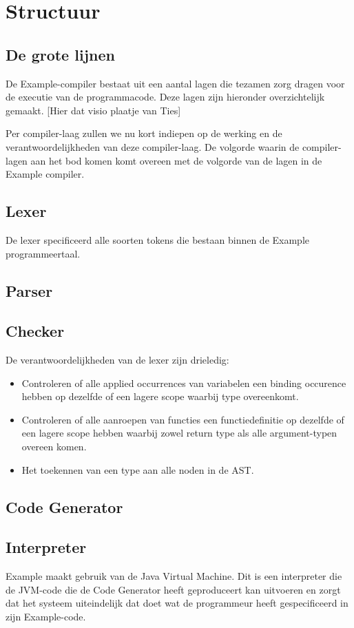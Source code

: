 \chapter{Structuur}
\section{De grote lijnen}
De Example-compiler bestaat uit een aantal lagen die tezamen zorg dragen voor de executie van de programmacode. Deze lagen zijn hieronder overzichtelijk gemaakt. 
[Hier dat visio plaatje van Ties]

Per compiler-laag zullen we nu kort indiepen op de werking en de verantwoordelijkheden van deze compiler-laag. De volgorde waarin de compiler-lagen aan het bod komen komt overeen met de volgorde van de lagen in de Example compiler. 

\section{Lexer}
De lexer specificeerd alle soorten tokens die bestaan binnen de Example programmeertaal.
\section{Parser}
\section{Checker}
De verantwoordelijkheden van de lexer zijn drieledig:
\begin{itemize}
	\item Controleren of alle applied occurrences van variabelen een binding occurence hebben op dezelfde of een lagere scope waarbij type overeenkomt.
	\item Controleren of alle aanroepen van functies een functiedefinitie op dezelfde of een lagere scope hebben waarbij zowel return type als alle argument-typen overeen komen.
	\item Het toekennen van een type aan alle noden in de AST.
\end{itemize}
\section{Code Generator}
\section{Interpreter}
Example maakt gebruik van de Java Virtual Machine. Dit is een interpreter die de JVM-code die de Code Generator heeft geproduceert kan uitvoeren en zorgt dat het systeem uiteindelijk dat doet wat de programmeur heeft gespecificeerd in zijn Example-code. 

